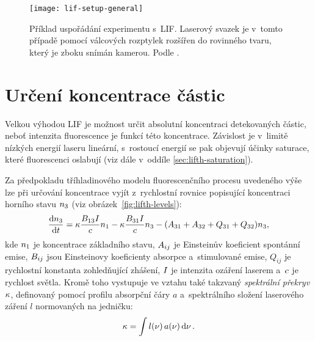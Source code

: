 \begin{figure}[htb]
	\centering
	\texttt{[image: lif-setup-general]}
	\caption{Příklad uspořádání experimentu s~LIF.
		Laserový svazek je v~tomto případě pomocí válcových rozptylek
		rozšířen do rovinného tvaru, který je zboku snímán kamerou.
		Podle \cite{lif-oh}.}
	\label{fig:lifth-setup}
\end{figure}

\section{Určení koncentrace částic}
\label{sec:lifth-concentration}
\providecommand\vol{V}
\providecommand\sensabs{D_\text{a}}
\providecommand\lifsens{D_\text{F}}
\providecommand\rayleighsens{D_\text{R}}
\providecommand\lifsignal{M_\text{F}}
\providecommand\rayleighsignal{M_\text{R}}
\providecommand\lifeff{\qeff_\text{F}}
\providecommand\rayleigheff{\qeff_\text{R}}
\providecommand\rayleighdxsect{\dv{\sigma_\text{R}}{\solidangle}}
\providecommand\rayleighndens{\ndens_\text{R}}
\providecommand\enlaserrayleigh{L_\text{R}}
\providecommand\beamprofile{s}
\providecommand\quenching{Q}
\providecommand\liftotal{F}
Velkou výhodou LIF je možnost určit absolutní koncentraci detekovaných částic,
neboť intenzita fluorescence je funkcí této koncentrace.
Závislost je v~limitě nízkých energií laseru lineární,
s~rostoucí energií se pak objevují účinky saturace,
které fluorescenci oslabují (viz dále v~oddíle \ref{sec:lifth-saturation}).

Za předpokladu tříhladinového modelu fluorescenčního procesu uvedeného výše
lze při určování koncentrace vyjít z~rychlostní rovnice popisující
koncentraci horního stavu $n_3$ (viz obrázek~\ref{fig:lifth-levels}):
\begin{equation}
	\label{eq:lifth-rate-simple}
	\dv{\ndens_3}{\tim}
	= \specoverlap \frac{\einsteinb13 \ity}{\lightspeed} \ndens_1
	- \specoverlap \frac{\einsteinb31 \ity}{\lightspeed} \ndens_3
	- ( \einsteina31 + \einsteina32 + \quenching_{31} + \quenching_{32} )
	\ndens_3,
\end{equation}
kde $n_1$ je koncentrace základního stavu,
$A_{ij}$ je Einsteinův koeficient spontánní emise,
$B_{ij}$ jsou Einsteinovy koeficienty absorpce a~stimulované emise,
$\quenching_{ij}$ je rychlostní konstanta zohledňující zhášení,
$I$ je intenzita ozáření laserem
a~$c$ je rychlost světla.
Kromě toho vystupuje ve vztahu také takzvaný
\emph{spektrální překryv} $\kappa$\autocite{lif-oh-argon},
definovaný pomocí profilu absorpční čáry $a$
a~spektrálního složení laserového záření $l$ normovaných na jedničku:
\begin{equation}
	\label{eq:lifth-specoverlap}
	\kappa = \int l(\nu)\,a(\nu) \dd{\nu}.
\end{equation}

